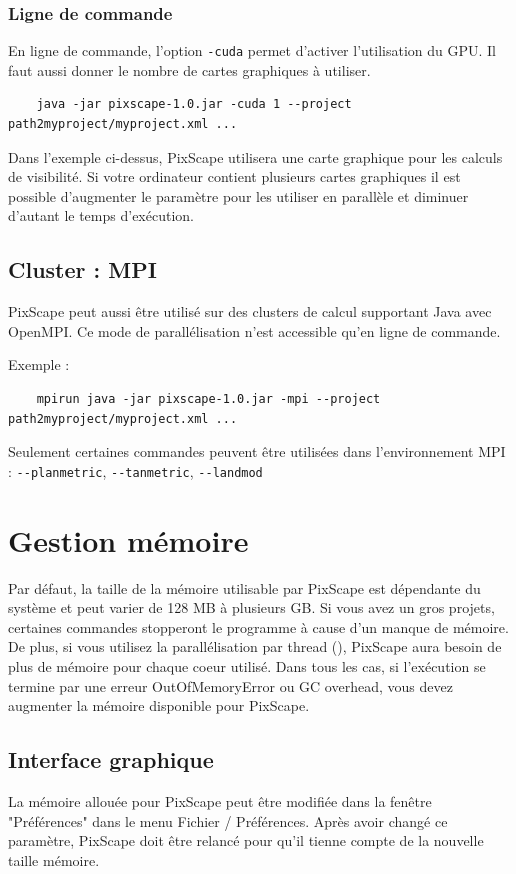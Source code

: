 \documentclass{report}
\begin{document}
\subsubsection{Ligne de commande}
En ligne de commande, l'option \verb|-cuda| permet d'activer l'utilisation du GPU. Il faut aussi donner le nombre de cartes graphiques à utiliser.

\begin{Verbatim}
	java -jar pixscape-1.0.jar -cuda 1 --project path2myproject/myproject.xml ...
\end{Verbatim}
Dans l'exemple ci-dessus, PixScape utilisera une carte graphique pour les calculs de visibilité. Si votre ordinateur contient plusieurs cartes graphiques il est possible d'augmenter le paramètre pour les utiliser en parallèle et diminuer d'autant le temps d'exécution.


\subsection{Cluster : MPI}
PixScape peut aussi être utilisé sur des clusters de calcul supportant Java avec OpenMPI. Ce mode de parallélisation n'est accessible qu'en ligne de commande.

Exemple :
\begin{Verbatim}
	mpirun java -jar pixscape-1.0.jar -mpi --project path2myproject/myproject.xml ...
\end{Verbatim}
Seulement certaines commandes peuvent être utilisées dans l'environnement MPI : \verb|--planmetric|, \verb|--tanmetric|, \verb|--landmod|


\section{Gestion mémoire}
\label{memory}
Par défaut, la taille de la mémoire utilisable par PixScape est dépendante du système et peut varier de 128 MB à plusieurs GB.
Si vous avez un gros projets, certaines commandes stopperont le programme à cause d'un manque de mémoire. De plus, si vous utilisez la parallélisation par thread (), PixScape aura besoin de plus de mémoire pour chaque coeur utilisé.
Dans tous les cas, si l'exécution se termine par une erreur OutOfMemoryError ou GC overhead, vous devez augmenter la mémoire disponible pour PixScape.

\subsection{Interface graphique}
La mémoire allouée pour PixScape peut être modifiée dans la fenêtre "Préférences" dans le menu Fichier / Préférences. Après avoir changé ce paramètre, PixScape doit être relancé pour qu'il tienne compte de la nouvelle taille mémoire.
\end{document}
